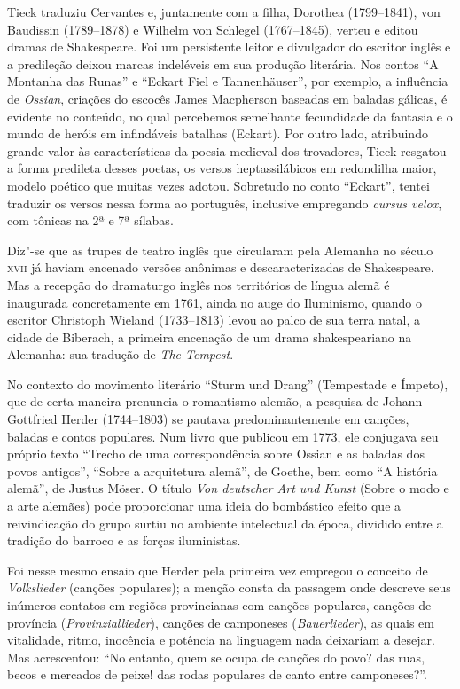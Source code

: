 Tieck traduziu Cervantes e, juntamente com a filha, Dorothea (1799--1841), 
von Baudissin (1789--1878) e Wilhelm von Schlegel (1767--1845), 
verteu e editou dramas de Shakespeare. Foi um persistente leitor e
divulgador do escritor inglês e a predileção deixou marcas indeléveis
em sua produção literária. Nos contos ``A Montanha das Runas'' e ``Eckart
Fiel e Tannenhäuser'', por exemplo, a influência de \textit{Ossian},
criações do escocês James Macpherson baseadas em baladas gálicas, é
evidente no conteúdo, no qual percebemos semelhante fecundidade da
fantasia e o mundo de heróis em infindáveis batalhas (Eckart). Por
outro lado, atribuindo grande valor às características da poesia
medieval dos trovadores, Tieck resgatou a forma predileta desses poetas,
os versos heptassilábicos em redondilha maior, modelo poético que
muitas vezes adotou. Sobretudo no conto ``Eckart'', tentei traduzir 
os versos nessa forma ao português, inclusive
empregando \textit{cursus velox}, com tônicas na 2ª e 7ª sílabas.

Diz"-se que as trupes de teatro inglês que circularam pela Alemanha no
século \textsc{xvii} já haviam encenado versões anônimas e descaracterizadas de
Shakespeare. Mas a recepção do dramaturgo inglês nos territórios de
língua alemã é inaugurada concretamente em 1761, ainda no auge do
Iluminismo, quando o escritor Christoph Wieland (1733--1813) levou ao
palco de sua terra natal, a cidade de Biberach, a primeira encenação de um
drama shakespeariano na Alemanha: sua tradução de \textit{The Tempest}. 

No contexto do movimento literário ``Sturm und Drang'' (Tempestade e
Ímpeto), que de certa maneira prenuncia o romantismo alemão, a pesquisa
de Johann Gottfried Herder (1744--1803) se pautava predominantemente em
canções, baladas e contos populares. Num livro que publicou em
1773, ele conjugava seu próprio texto ``Trecho de uma correspondência
sobre Ossian e as baladas dos povos antigos'', ``Sobre a arquitetura
alemã'', de Goethe, bem como ``A história alemã'', de Justus Möser. O
título \textit{Von deutscher Art und Kunst} (Sobre o modo e a arte
alemães) pode proporcionar uma ideia do bombástico efeito que a
reivindicação do grupo surtiu no ambiente intelectual da época,
dividido entre a tradição do barroco e as forças iluministas. 

Foi nesse mesmo ensaio que Herder pela primeira vez empregou o conceito de
\textit{Volkslieder} (canções populares); a menção consta da passagem onde
descreve seus inúmeros contatos em regiões provincianas com canções
populares, canções de província (\textit{Provinziallieder}), canções de
camponeses (\textit{Bauerlieder}), as quais em vitalidade, ritmo, inocência e
potência na linguagem nada deixariam a desejar. Mas acrescentou: ``No
entanto, quem se ocupa de canções do povo? das ruas, becos e mercados
de peixe! das rodas populares de canto entre camponeses?''.

